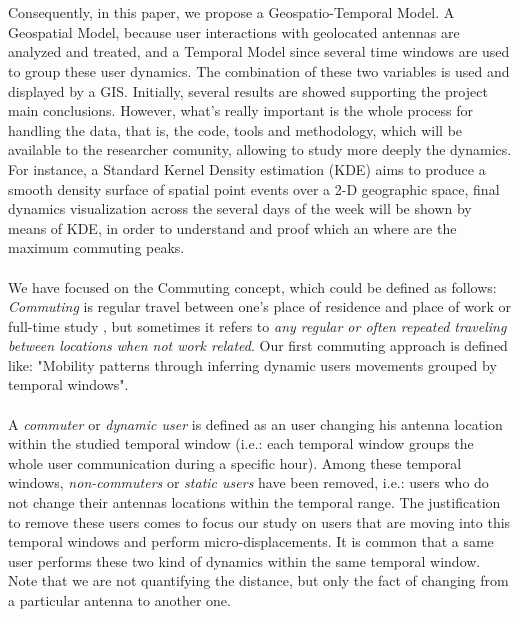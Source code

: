 \\
\\
Consequently, in this paper, we propose a Geospatio-Temporal Model. A Geospatial Model, because user interactions with geolocated antennas are analyzed and treated, and a Temporal Model since several time windows are used to group these user dynamics. The combination of these two variables is used and displayed by a GIS. Initially, several results are showed supporting the project main conclusions. However, what's really important is the whole process for handling the data, that is, the code, tools and methodology, which will be available to the researcher comunity, allowing to study more deeply the dynamics. For instance, a Standard Kernel Density estimation (KDE) aims to produce a smooth density surface of spatial point events over a 2-D geographic space\citep{SIM:SIM4780090616,5969036}, final dynamics visualization across the several days of the week will be shown by means of KDE, in order to understand and proof which an where are the maximum commuting peaks. 
\\
\\
We have focused on the Commuting concept, which could be defined as follows: \emph{Commuting} is regular travel between one's place of residence and place of work or full-time study \citep{wiki:commuting}, but  sometimes it refers to \emph{any regular or often repeated traveling between locations when not work related}. Our first commuting approach is defined like: "Mobility patterns through inferring dynamic users movements grouped by temporal windows". 
\\
\\
A {\it commuter} or {\it dynamic user} is defined as an user changing his antenna location within the studied temporal window (i.e.: each temporal window groups the whole user communication during a specific hour). Among these temporal windows, {\it non-commuters} or {\it static users} have been removed, i.e.: users who do not change their antennas locations within the temporal range. The justification to remove these users comes to focus our study on users that are moving into this temporal windows and perform micro-displacements. It is common that a same user performs these two kind of dynamics within the same temporal window. Note that we are not quantifying the distance, but only the fact of changing from a particular antenna to another one.
\\
\\